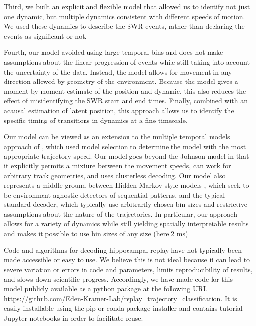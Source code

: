 \documentclass[9pt,lineno]{elife}
\begin{document}
Third, we built an explicit and flexible model that allowed us to identify not just one dynamic, but multiple dynamics consistent with different speeds of motion. We used these dynamics to describe the SWR events, rather than declaring the events as significant or not.

Fourth, our model avoided using large temporal bins and does not make assumptions about the linear progression of events while still taking into account the uncertainty of the data. Instead, the model allows for movement in any direction allowed by geometry of the environment. Because the model gives a moment-by-moment estimate of the position and dynamic, this also reduces the effect of misidentifying the SWR start and end times. Finally, combined with an acausal estimation of latent position, this approach allows us to identify the specific timing of transitions in dynamics at a fine timescale.

Our model can be viewed as an extension to the multiple temporal models approach of \cite{JohnsonMeasuringdistributedproperties2008}, which used model selection to determine the model with the most appropriate trajectory speed. Our model goes beyond the Johnson model in that it explicitly permits a mixture between the movement speeds, can work for arbitrary track geometries, and uses clusterless decoding. Our model also represents a middle ground between Hidden Markov-style models \citep{MaboudiUncoveringtemporalstructure2018, ChenBayesiannonparametricmethods2016, LindermanBayesiannonparametricapproach2016, ChenUncoveringspatialtopology2012}, which seek to be environment-agnostic detectors of sequential patterns, and the typical standard decoder, which typically use arbitrarily chosen bin sizes and restrictive assumptions about the nature of the trajectories. In particular, our approach allows for a variety of dynamics while still yielding spatially interpretable results and makes it possible to use bin sizes of any size (here 2 ms)

Code and algorithms for decoding hippocampal replay have not typically been made accessible or easy to use. We believe this is not ideal because it can lead to severe variation or errors in code and parameters, limits reproducibility of results, and slows down scientific progress. Accordingly, we have made code for this model publicly available as a python package at the following URL \url{https://github.com/Eden-Kramer-Lab/replay_trajectory_classification}. It is easily installable using the pip or conda package installer and contains tutorial Jupyter notebooks in order to facilitate reuse.
\end{document}
